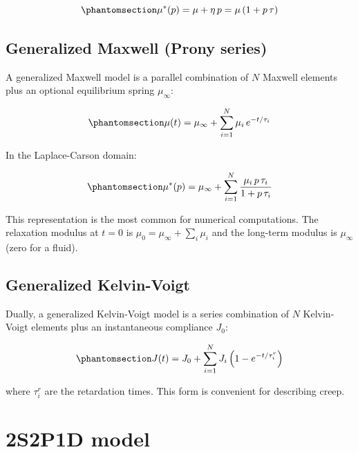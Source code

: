 \documentclass[
  a4paper,
  numbers=noendperiod,
  DIV=12]{scrreprt}
\begin{document}
\begin{equation}\protect\phantomsection\label{eq-kelvin-voigt}{
\mu^*(p) = \mu + \eta \, p = \mu\left(1 + p\,\tau\right)
}\end{equation}

\subsection{Generalized Maxwell (Prony series)}\label{sec-prony}

A generalized Maxwell model is a parallel combination of \(N\) Maxwell
elements plus an optional equilibrium spring \(\mu_\infty\):

\begin{equation}\protect\phantomsection\label{eq-prony}{
\mu(t) = \mu_\infty + \sum_{i=1}^{N} \mu_i \, e^{-t/\tau_i}
}\end{equation}

In the Laplace-Carson domain:

\begin{equation}\protect\phantomsection\label{eq-prony-lc}{
\mu^*(p) = \mu_\infty + \sum_{i=1}^{N} \frac{\mu_i \, p \, \tau_i}{1 + p \, \tau_i}
}\end{equation}

This representation is the most common for numerical computations. The
relaxation modulus at \(t=0\) is \(\mu_0 = \mu_\infty + \sum_i \mu_i\)
and the long-term modulus is \(\mu_\infty\) (zero for a fluid).

\subsection{Generalized Kelvin-Voigt}\label{generalized-kelvin-voigt}

Dually, a generalized Kelvin-Voigt model is a series combination of
\(N\) Kelvin-Voigt elements plus an instantaneous compliance \(J_0\):

\begin{equation}\protect\phantomsection\label{eq-gen-kv}{
J(t) = J_0 + \sum_{i=1}^{N} J_i \left(1 - e^{-t/\tau_i^r}\right)
}\end{equation}

where \(\tau_i^r\) are the retardation times. This form is convenient
for describing creep.

\section{2S2P1D model}\label{sec-2S2P1D}
\end{document}
